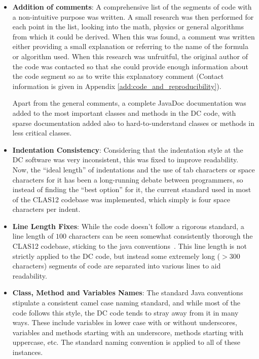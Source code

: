     \begin{itemize}
        \item \textbf{Addition of comments}: A comprehensive list of the segments of code with a non-intuitive purpose was written.
        A small research was then performed for each point in the list, looking into the math, physics or general algorithms from which it could be derived.
        When this was found, a comment was written either providing a small explanation or referring to the name of the formula or algorithm used.
        When this research was unfruitful, the original author of the code was contacted so that she could provide enough information about the code segment so as to write this explanatory comment (Contact information is given in Appendix \ref{add:code_and_reproducibility}).
    
        Apart from the general comments, a complete JavaDoc documentation was added to the most important classes and methods in the DC code, with sparse documentation added also to hard-to-understand classes or methods in less critical classes.
    
        \item \textbf{Indentation Consistency}: Considering that the indentation style at the DC software was very inconsistent, this was fixed to improve readability.
        Now, the ``ideal length'' of indentations and the use of tab characters or space characters for it has been a long-running debate between programmers, so instead of finding the ``best option'' for it, the current standard used in most of the CLAS12 codebase was implemented, which simply is four space characters per indent.
    
        \item \textbf{Line Length Fixes}: While the code doesn't follow a rigorous standard, a line length of $100$ characters can be seen somewhat consistently thorough the CLAS12 codebase, sticking to the java conventions~\cite{sun1997java}.
        This line length is not strictly applied to the DC code, but instead some extremely long ($>300$ characters) segments of code are separated into various lines to aid readability.
    
        \item \textbf{Class, Method and Variables Names}: The standard Java conventions stipulate a consistent camel case naming standard, and while most of the code follows this style, the DC code tends to stray away from it in many ways.
        These include variables in lower case with or without underscores, variables and methods starting with an underscore, methods starting with uppercase, etc.
        The standard naming convention is applied to all of these instances.
    \end{itemize}

